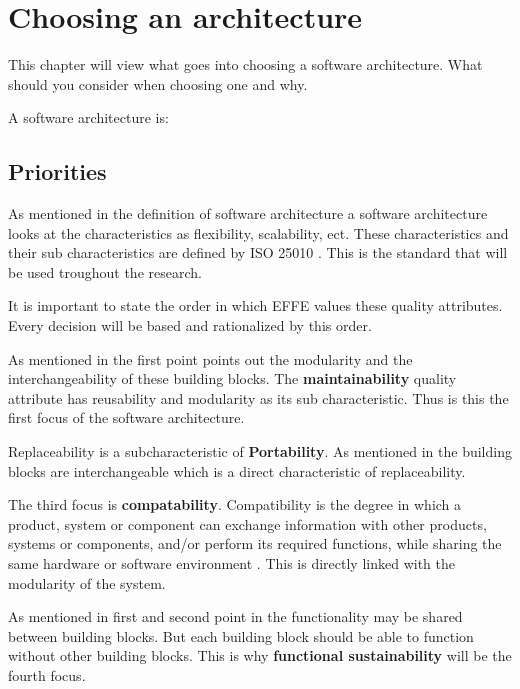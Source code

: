 \chapter{Choosing an architecture}
\label{sec:ChoosingArchitecture}

This chapter will view what goes into choosing a software architecture. What should you consider when choosing one and why.

A software architecture is:


\section{Priorities}
\label{sec:Priorities}

As mentioned in the definition of software architecture  a software architecture looks at the characteristics as flexibility, scalability, ect. These characteristics and their sub characteristics are defined by ISO 25010 \cite{iso25010}. This is the standard that will be used troughout the research.

It is important to state the order in which EFFE values these quality attributes. Every decision will be based and rationalized by this order.

As mentioned in  the first point points out the modularity and the interchangeability of these building blocks. The \textbf{maintainability} quality attribute has reusability and modularity as its sub characteristic. Thus is this the first focus of the software architecture.

Replaceability is a subcharacteristic of \textbf{Portability}. As mentioned in  the building blocks are interchangeable which is a direct characteristic of replaceability.

The third focus is \textbf{compatability}. Compatibility is the degree in which a product, system or component can exchange information with other products, systems or components, and/or perform its required functions, while sharing the same hardware or software environment \cite{iso25010}. This is directly linked with the modularity of the system.

As mentioned in first and second point in  the functionality may be shared between building blocks. But each building block should be able to function without other building blocks. This is why \textbf{functional sustainability} will be the fourth focus.

